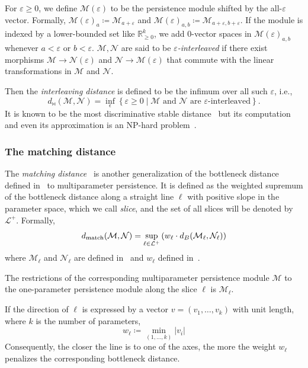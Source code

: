 \documentclass[sigconf, nonacm, natbib=false]{acmart} %
\def\M {{\mathcal{M}}}
\def\N {{\mathcal{N}}}
\def\RR{{\mathbb{R}}}
\def\param{k}
\def\interdist{d_{\bowtie}}
\def\matchdist{d_{\textnormal{match}}}
\theoremstyle{plain}
\begin{document}
For $\varepsilon\geq0$, we define $\M(\varepsilon)$ to be the persistence module shifted by the all-$\varepsilon$ vector. 
Formally, ${\M(\varepsilon)}_a\coloneqq {\M}_{a+\varepsilon}$ and ${\M(\varepsilon)}_{a,b}\coloneqq \M_{a+\varepsilon,b+\varepsilon}$. 
If the module is indexed by a lower-bounded set like $\RR_{\geq0}^{\param}$, we add 0-vector spaces in ${\M(\varepsilon)}_{a,b}$ whenever $a<\varepsilon$ or $b<\varepsilon$. 
$\M,\N$ are said to be \emph{$\varepsilon$-interleaved} if there exist morphisms $\M\rightarrow\N(\varepsilon)$ and $\N\rightarrow\M(\varepsilon)$ that commute with the linear transformations in $\M$ and $\N$.

Then the \emph{interleaving distance} is defined to be the infimum over all such $\varepsilon$, i.e.,
\begin{equation}
  \interdist(\M,\N) = \inf_{\epsilon}\left\{\varepsilon\geq 0\mid \text{$\M$ and $\N$ are $\varepsilon$-interleaved}\right\}.
\end{equation}
It is known to be the most discriminative stable distance~\cite{lesnick2015theory} but its computation and even its approximation is an NP-hard problem~\cite{bjerkevik2019computing}.

\subsubsection{The matching distance}\label{sec:matching_dist}

The \emph{matching distance}~\cite{cerri2013betti} is another generalization of the bottleneck distance defined in~ to multiparameter persistence. It is defined as the weighted supremum of the bottleneck distance along a straight line $\ell$ with positive slope in the parameter space, which we call \emph{slice}, and the set of all slices will be denoted by $\mathcal{L}^+$. Formally,
\begin{equation}
\matchdist(\M,\N) = \sup_{\ell\in\mathcal{L}^+}\left( w_\ell\cdot d_B(\M_\ell,\N_\ell)\right)    
\end{equation}
where $\M_\ell$ and $\N_\ell$ are defined in~ and $w_{\ell}$ defined in~.
\begin{definition}[$\M_\ell$]
The restrictions of the corresponding multiparameter persistence module $\M$ to the one-parameter persistence module along the slice $\ell$ is $\M_\ell$.\label{def:module_l}
\end{definition}
If the direction of $\ell$ is expressed by a vector $v=(v_1,\ldots,v_\param)$ with unit length, where $\param$ is the number of parameters, 
\begin{equation}
  w_\ell\coloneqq \min_{(1,\ldots,\param)}{|v_i|} \label{eq:weight_slice_line}
\end{equation}
Consequently, the closer the line is to one of the axes, the more the weight $w_\ell$ penalizes the corresponding bottleneck distance. 
\end{document}
